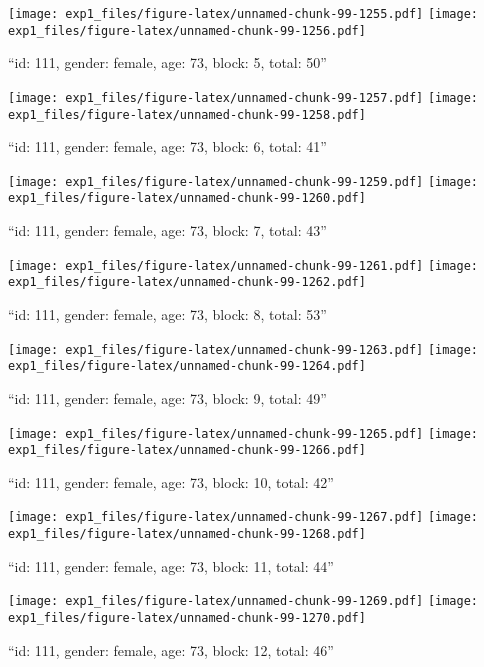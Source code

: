 \documentclass[,]{article}
\begin{document}
\texttt{[image: exp1\_files/figure-latex/unnamed-chunk-99-1255.pdf]}
\texttt{[image: exp1\_files/figure-latex/unnamed-chunk-99-1256.pdf]}

\newpage
[1] 

``id: 111, gender: female, age: 73, block: 5, total: 50''

\texttt{[image: exp1\_files/figure-latex/unnamed-chunk-99-1257.pdf]}
\texttt{[image: exp1\_files/figure-latex/unnamed-chunk-99-1258.pdf]}

\newpage
[1] 

``id: 111, gender: female, age: 73, block: 6, total: 41''

\texttt{[image: exp1\_files/figure-latex/unnamed-chunk-99-1259.pdf]}
\texttt{[image: exp1\_files/figure-latex/unnamed-chunk-99-1260.pdf]}

\newpage
[1] 

``id: 111, gender: female, age: 73, block: 7, total: 43''

\texttt{[image: exp1\_files/figure-latex/unnamed-chunk-99-1261.pdf]}
\texttt{[image: exp1\_files/figure-latex/unnamed-chunk-99-1262.pdf]}

\newpage
[1] 

``id: 111, gender: female, age: 73, block: 8, total: 53''

\texttt{[image: exp1\_files/figure-latex/unnamed-chunk-99-1263.pdf]}
\texttt{[image: exp1\_files/figure-latex/unnamed-chunk-99-1264.pdf]}

\newpage
[1] 

``id: 111, gender: female, age: 73, block: 9, total: 49''

\texttt{[image: exp1\_files/figure-latex/unnamed-chunk-99-1265.pdf]}
\texttt{[image: exp1\_files/figure-latex/unnamed-chunk-99-1266.pdf]}

\newpage
[1] 

``id: 111, gender: female, age: 73, block: 10, total: 42''

\texttt{[image: exp1\_files/figure-latex/unnamed-chunk-99-1267.pdf]}
\texttt{[image: exp1\_files/figure-latex/unnamed-chunk-99-1268.pdf]}

\newpage
[1] 

``id: 111, gender: female, age: 73, block: 11, total: 44''

\texttt{[image: exp1\_files/figure-latex/unnamed-chunk-99-1269.pdf]}
\texttt{[image: exp1\_files/figure-latex/unnamed-chunk-99-1270.pdf]}

\newpage
[1] 

``id: 111, gender: female, age: 73, block: 12, total: 46''
\end{document}
